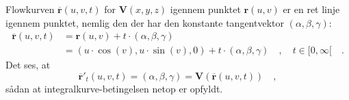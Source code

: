 \begin{example}
Flowkurven $\overline{\mathbf{r}}(u,v,t)$ for $\mathbf{V}(x,y,z)$ igennem punktet $\mathbf{r}(u,v)$ er en ret linje igennem punktet, nemlig den der har den konstante tangentvektor $(\alpha, \beta, \gamma)$:
\begin{equation}
\begin{aligned}
\overline{\mathbf{r}}(u,v,t) &= \mathbf{r}(u,v) + t\cdot (\alpha, \beta, \gamma)  \\
&= (u\cdot \cos(v), u\cdot \sin(v), 0) + t\cdot (\alpha, \beta, \gamma)
\quad , \quad t\in [0, \infty[ \quad .
\end{aligned}
\end{equation}
Det ses, at
\begin{equation}
\overline{\mathbf{r}}'_{t}(u,v,t) =  (\alpha, \beta, \gamma) = \mathbf{V}(\overline{\mathbf{r}}(u,v,t)) \quad ,
\end{equation}
sådan at integralkurve-betingelsen netop er opfyldt.\\


\end{example}
